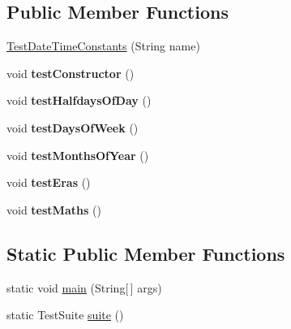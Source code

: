 \subsection*{Public Member Functions}
\begin{DoxyCompactItemize}
\item 
\hyperlink{classorg_1_1joda_1_1time_1_1_test_date_time_constants_a7f1ec4f16d3312755975181832c229e9}{Test\-Date\-Time\-Constants} (String name)
\item 
\hypertarget{classorg_1_1joda_1_1time_1_1_test_date_time_constants_a6c39d4507250663bd45d13e6678e428f}{void {\bfseries test\-Constructor} ()}\label{classorg_1_1joda_1_1time_1_1_test_date_time_constants_a6c39d4507250663bd45d13e6678e428f}

\item 
\hypertarget{classorg_1_1joda_1_1time_1_1_test_date_time_constants_a3ed362e9d991d4c2fe2e26e8d629bf2c}{void {\bfseries test\-Halfdays\-Of\-Day} ()}\label{classorg_1_1joda_1_1time_1_1_test_date_time_constants_a3ed362e9d991d4c2fe2e26e8d629bf2c}

\item 
\hypertarget{classorg_1_1joda_1_1time_1_1_test_date_time_constants_a7bfe2732767159cd561f9d3cf8c887ab}{void {\bfseries test\-Days\-Of\-Week} ()}\label{classorg_1_1joda_1_1time_1_1_test_date_time_constants_a7bfe2732767159cd561f9d3cf8c887ab}

\item 
\hypertarget{classorg_1_1joda_1_1time_1_1_test_date_time_constants_a2b9af9a8e9b395f44a732ced38d86773}{void {\bfseries test\-Months\-Of\-Year} ()}\label{classorg_1_1joda_1_1time_1_1_test_date_time_constants_a2b9af9a8e9b395f44a732ced38d86773}

\item 
\hypertarget{classorg_1_1joda_1_1time_1_1_test_date_time_constants_a93a872f195d620989482adee69959c8e}{void {\bfseries test\-Eras} ()}\label{classorg_1_1joda_1_1time_1_1_test_date_time_constants_a93a872f195d620989482adee69959c8e}

\item 
\hypertarget{classorg_1_1joda_1_1time_1_1_test_date_time_constants_a05ae4aec193ad2069afe4b0517bd953d}{void {\bfseries test\-Maths} ()}\label{classorg_1_1joda_1_1time_1_1_test_date_time_constants_a05ae4aec193ad2069afe4b0517bd953d}

\end{DoxyCompactItemize}
\subsection*{Static Public Member Functions}
\begin{DoxyCompactItemize}
\item 
static void \hyperlink{classorg_1_1joda_1_1time_1_1_test_date_time_constants_acdd4493b6d0930adad5b365aa6952dd2}{main} (String\mbox{[}$\,$\mbox{]} args)
\item 
static Test\-Suite \hyperlink{classorg_1_1joda_1_1time_1_1_test_date_time_constants_ab9ba69604c773e05435d2332dd3679b4}{suite} ()
\end{DoxyCompactItemize}


